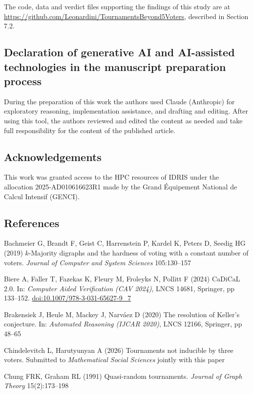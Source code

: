 \documentclass[
]{article}
\begin{document}
The code, data and verdict files supporting the findings of this study
are at \url{https://github.com/Leonardini/TournamentsBeyond5Voters},
described in Section 7.2.

\subsection{Declaration of generative AI and AI-assisted technologies in
the manuscript preparation
process}\label{declaration-of-generative-ai-and-ai-assisted-technologies-in-the-manuscript-preparation-process}

During the preparation of this work the authors used Claude (Anthropic)
for exploratory reasoning, implementation assistance, and drafting and
editing. After using this tool, the authors reviewed and edited the
content as needed and take full responsibility for the content of the
published article.

\subsection{Acknowledgements}\label{acknowledgements}

This work was granted access to the HPC resources of IDRIS under the
allocation 2025-AD010616623R1 made by the Grand Équipement National de
Calcul Intensif (GENCI).

\subsection{References}\label{references}

Bachmeier G, Brandt F, Geist C, Harrenstein P, Kardel K, Peters D,
Seedig HG (2019) \(k\)-Majority digraphs and the hardness of voting with
a constant number of voters. \emph{Journal of Computer and System
Sciences} 105:130--157

Biere A, Faller T, Fazekas K, Fleury M, Froleyks N, Pollitt F (2024)
CaDiCaL 2.0. In: \emph{Computer Aided Verification (CAV 2024)}, LNCS
14681, Springer, pp 133--152. \url{doi:10.1007/978-3-031-65627-9_7}

Brakensiek J, Heule M, Mackey J, Narváez D (2020) The resolution of
Keller's conjecture. In: \emph{Automated Reasoning (IJCAR 2020)}, LNCS
12166, Springer, pp 48--65

Chindelevitch L, Harutyunyan A (2026) Tournaments not inducible by three
voters. Submitted to \emph{Mathematical Social Sciences} jointly with
this paper

Chung FRK, Graham RL (1991) Quasi-random tournaments. \emph{Journal of
Graph Theory} 15(2):173--198
\end{document}
